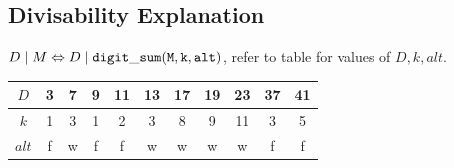 \documentclass[10pt,a4paper,ngerman,oneside,]{article}
\begin{document}
\begin{multicols}{2}
\subsection{Divisability Explanation}
$D \mid M \Leftrightarrow D \mid {\tt digit\_sum(M, k, alt)}$, refer to table for values of $D, k, alt$.
\begin{table}[htbp]
\begin{tabular}{| c || c | c | c | c | c | c | c | c | c | c |}
\hline
$D$ & 3 & 7 & 9 & 11 & 13 & 17 & 19 & 23 & 37 & 41 \\
\hline
$k$ & 1 & 3 & 1 & 2 & 3 & 8 & 9 & 11 & 3 & 5 \\
\hline
$alt$ & f & w & f & f & w & w & w & w & f & f \\ 
\hline
\end{tabular}
\end{table}

\end{multicols}
\end{document}
